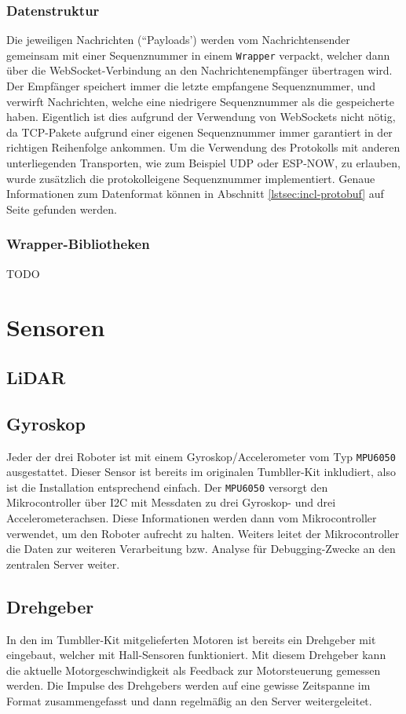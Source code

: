\subsubsection{Datenstruktur}
Die jeweiligen Nachrichten (``Payloads')
werden vom Nachrichtensender gemeinsam mit einer Sequenznummer in einem \texttt{Wrapper} verpackt,
welcher dann über die WebSocket-Verbindung an den Nachrichtenempfänger übertragen wird.
%
Der Empfänger speichert immer die letzte empfangene Sequenznummer,
und verwirft Nachrichten,
welche eine niedrigere Sequenznummer als die gespeicherte haben.
%
Eigentlich ist dies aufgrund der Verwendung von WebSockets nicht nötig,
da TCP-Pakete aufgrund einer eigenen Sequenznummer immer garantiert in der richtigen Reihenfolge ankommen.
%
Um die Verwendung des Protokolls mit anderen unterliegenden Transporten,
wie zum Beispiel UDP oder ESP-NOW,
zu erlauben,
wurde zusätzlich die protokolleigene Sequenznummer implementiert.
%
Genaue Informationen zum Datenformat können in Abschnitt
\ref{lstsec:incl-protobuf} auf Seite
\pageref{lstsec:incl-protobuf} gefunden werden.

\subsubsection{Wrapper-Bibliotheken}
TODO

\section{Sensoren}
\label{subsec:ueberblick_sensors}

\subsection{LiDAR}
\label{subsec:ueberblick_lidar}

\subsection{Gyroskop}
Jeder der drei Roboter ist mit einem Gyroskop/Accelerometer vom Typ \texttt{MPU6050} ausgestattet.
%
Dieser Sensor ist bereits im originalen Tumbller-Kit inkludiert, also ist die Installation entsprechend einfach.
%
Der \texttt{MPU6050} versorgt den Mikrocontroller über I2C mit Messdaten zu drei Gyroskop- und drei Accelerometerachsen.
%
Diese Informationen werden dann vom Mikrocontroller verwendet, um den Roboter aufrecht zu halten.
%
Weiters leitet der Mikrocontroller die Daten zur weiteren Verarbeitung bzw. Analyse für Debugging-Zwecke an den zentralen Server weiter.

\subsection{Drehgeber}
\label{subsec:ueberblick_rot_enc}
In den im Tumbller-Kit mitgelieferten Motoren ist bereits ein Drehgeber mit eingebaut,
welcher mit Hall-Sensoren funktioniert.
%
Mit diesem Drehgeber kann die aktuelle Motorgeschwindigkeit als Feedback zur Motorsteuerung gemessen werden.
%
Die Impulse des Drehgebers werden auf eine gewisse Zeitspanne im Format zusammengefasst und dann regelmäßig an den Server weitergeleitet.